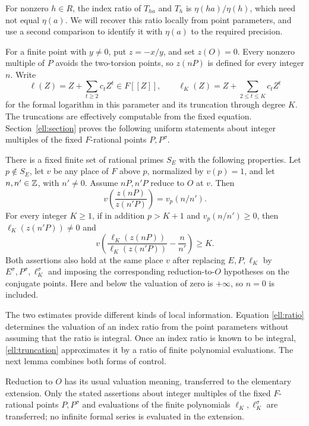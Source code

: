 For nonzero \(h\in R\), the index ratio of \(T_{ha}\) and \(T_h\) is
\(\eta(ha)/\eta(h)\), which need not equal \(\eta(a)\).  We will
recover this ratio locally from point parameters, and use a second
comparison to identify it with \(\eta(a)\) to the required precision.

For a finite point with \(y\ne0\), put \(z=-x/y\), and set \(z(O)=0\).
Every nonzero multiple of \(P\) avoids the two-torsion points, so
\(z(nP)\) is defined for every integer \(n\).  Write
\[
 \ell(Z)=Z+\sum_{t\ge2}c_tZ^t\in F[[Z]],\qquad
 \ell_K(Z)=Z+\sum_{2\le t\le K}c_tZ^t
\]
for the formal logarithm in this parameter and its truncation through
degree \(K\).  The truncations are effectively computable from the
fixed equation.  Section~\ref{ell:section} proves the following uniform
statements about integer multiples of the fixed \(F\)-rational points
\(P,P^\sigma\).

\begin{proposition}\label{ell:formal}
There is a fixed finite set of rational primes $S_E$ with the following
properties.  Let $p\notin S_E$, let $v$ be any place of $F$ above $p$,
normalized by $v(p)=1$, and let $n,n'\in\mathbb Z$, with $n'\ne0$.  Assume
$nP,n'P$ reduce to $O$ at $v$.  Then
\begin{equation}\label{ell:ratio}
           v\!\left(\frac{z(nP)}{z(n'P)}\right)=v_p(n/n').
\end{equation}
For every integer $K\ge1$, if in addition $p>K+1$ and $v_p(n/n')\ge0$,
then $\ell_K(z(n'P))\ne0$ and
\begin{equation}\label{ell:truncation}
 v\!\left(\frac{\ell_K(z(nP))}{\ell_K(z(n'P))}-\frac n{n'}\right)
                         \ge K.
\end{equation}
Both assertions also hold at the same place $v$ after replacing
$E,P,\ell_K$ by $E^\sigma,P^\sigma,\ell_K^\sigma$ and imposing the
corresponding reduction-to-$O$ hypotheses on the conjugate points.
Here and below the valuation of zero is $+\infty$, so $n=0$ is included.
\end{proposition}

The two estimates provide different kinds of local information. Equation
\eqref{ell:ratio} determines the valuation of an index ratio from the
point parameters without assuming that the ratio is integral. Once an
index ratio is known to be integral, \eqref{ell:truncation} approximates
it by a ratio of finite polynomial evaluations. The next lemma combines both forms of control.

Reduction to \(O\) has its usual valuation meaning, transferred to the
elementary extension.
Only the stated assertions about integer multiples of the fixed
\(F\)-rational points \(P,P^\sigma\) and evaluations of the finite
polynomials \(\ell_K,\ell_K^\sigma\) are transferred; no infinite
formal series is evaluated in the extension.

